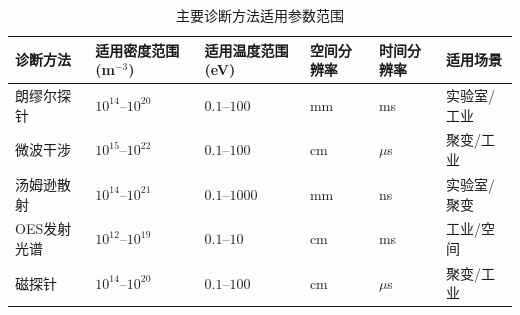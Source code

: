 \documentclass[12pt,a4paper,openany,oneside]{book}
\begin{document}
\begin{table}[htbp]
\centering
\caption{主要诊断方法适用参数范围}
\small
\begin{tabular}{@{}lp{2.6cm}p{2.4cm}lll@{}}
\toprule
\textbf{诊断方法} & \textbf{适用密度范围 (m$^{-3}$)} & \textbf{适用温度范围 (eV)} & \textbf{空间分辨率} & \textbf{时间分辨率} & \textbf{适用场景} \\
\midrule
朗缪尔探针 & $10^{14}$--$10^{20}$ & $0.1$--$100$ & mm & ms & 实验室/工业 \\
微波干涉 & $10^{15}$--$10^{22}$ & $0.1$--$100$ & cm & $\mu$s & 聚变/工业 \\
汤姆逊散射 & $10^{14}$--$10^{21}$ & $0.1$--$1000$ & mm & ns & 实验室/聚变 \\
OES发射光谱 & $10^{12}$--$10^{19}$ & $0.1$--$10$ & cm & ms & 工业/空间 \\
磁探针 & $10^{14}$--$10^{20}$ & $0.1$--$100$ & cm & $\mu$s & 聚变/工业 \\
\bottomrule
\end{tabular}
\end{table}
\end{document}
